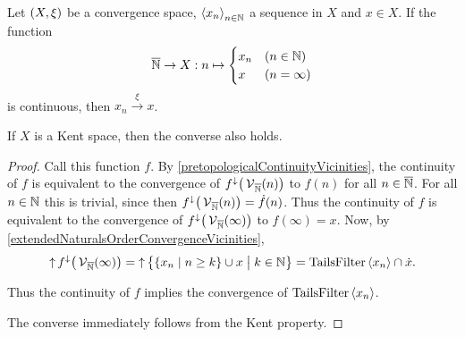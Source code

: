 \begin{lemma} \label{continuitySequenceAsFunction}
Let $\sSet{X,\xi}$ be a convergence space, $\left\langle x_n \right\rangle_{n\in \mathbb{N}}$ a sequence in $X$ and $x\in X$. If the function
\[ \overline{\mathbb{N}} \to X: n \mapsto \begin{cases}
x_n & (n\in \mathbb{N}) \\
x & (n = \infty)
\end{cases} \]
is continuous, then $x_n \overset{\xi}{\longrightarrow} x$.

If $X$ is a Kent space, then the converse also holds.
\end{lemma}
\begin{proof}
Call this function $f$. By \ref{pretopologicalContinuityVicinities}, the continuity of $f$ is equivalent to the convergence of $f^\downarrow\big(\operatorname{\mathcal{V}}_{\overline{\mathbb{N}}}(n)\big)$ to $f(n)$ for all $n\in \overline{\mathbb{N}}$. For all $n\in \mathbb{N}$ this is trivial, since then $f^\downarrow\big(\operatorname{\mathcal{V}}_{\overline{\mathbb{N}}}(n)\big) = \dot{f}(n)$.
Thus the continuity of $f$ is equivalent to the convergence of $f^\downarrow\big(\operatorname{\mathcal{V}}_{\overline{\mathbb{N}}}(\infty)\big)$ to $f(\infty) = x$.
Now, by \ref{extendedNaturalsOrderConvergenceVicinities},
\[ \upset f^\imf\big(\vicinity_{\overline{\N}}(\infty)\big) = \upset \setbuilder[\big]{\setbuilder{x_n}{n\geq k}\cup x}{k\in \N} = \TailsFilter\seq{x_n}\cap \pfilter{x}. \]

Thus the continuity of $f$ implies the convergence of $\operatorname{TailsFilter}\left\langle x_n \right\rangle$.

The converse immediately follows from the Kent property.
\end{proof}


